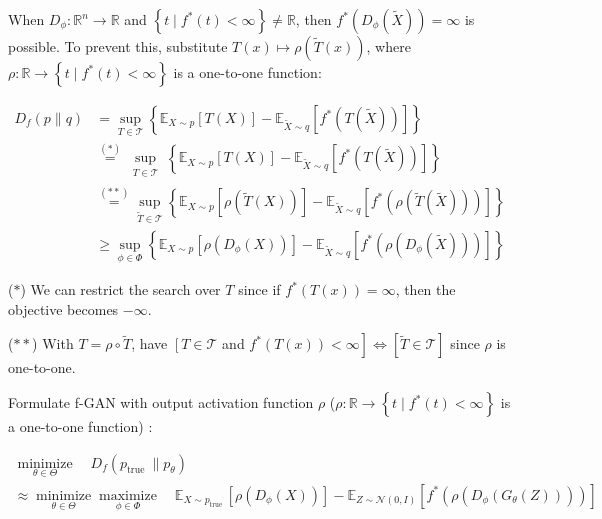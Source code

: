 \begin{concept}
    When $D_{\phi}: \mathbb{R}^{n} \rightarrow \mathbb{R}$ and $\left\{t \mid f^{*}(t)<\infty\right\} \neq \mathbb{R}$, then $f^{*}\left(D_{\phi}(\tilde{X})\right)=\infty$ is possible. To prevent this, substitute $T(x) \mapsto \rho(\tilde{T}(x))$, where $\rho: \mathbb{R} \rightarrow\left\{t \mid f^{*}(t)<\infty\right\}$ is a one-to-one function:

    $$
    \begin{aligned}
    D_{f}(p \| q) & =\sup _{T \in \mathcal{T}}\left\{\mathbb{E}_{X \sim p}[T(X)]-\mathbb{E}_{\tilde{X} \sim q}\left[f^{*}(T(\tilde{X}))\right]\right\} \\
    & \stackrel{(*)}{=} \sup _{\substack{T \in \mathcal{T}}}\left\{\mathbb{E}_{X \sim p}[T(X)]-\mathbb{E}_{\tilde{X} \sim q}\left[f^{*}(T(\tilde{X}))\right]\right\} \\
    & \stackrel{(* *)}{=} \sup _{\tilde{T} \in \mathcal{T}}\left\{\mathbb{E}_{X \sim p}[\rho(\tilde{T}(X))]-\mathbb{E}_{\tilde{X} \sim q}\left[f^{*}(\rho(\tilde{T}(\tilde{X})))\right]\right\} \\
    & \geq \sup _{\phi \in \Phi}\left\{\mathbb{E}_{X \sim p}\left[\rho\left(D_{\phi}(X)\right)\right]-\mathbb{E}_{\tilde{X} \sim q}\left[f^{*}\left(\rho\left(D_{\phi}(\tilde{X})\right)\right)\right]\right\}
    \end{aligned}
    $$

    ($*$) We can restrict the search over $T$ since if $f^{*}(T(x))=\infty$, then the objective becomes $-\infty$.

    ($**$) With $T=\rho \circ \tilde{T}$, have $\left[T \in \mathcal{T}\right.$ and $\left.f^{*}(T(x))<\infty\right] \Leftrightarrow[\tilde{T} \in \mathcal{T}]$ since $\rho$ is one-to-one.
\end{concept}

\begin{definition}
    Formulate f-GAN with output activation function $\rho$ ($\rho: \mathbb{R} \rightarrow\left\{t \mid f^{*}(t)<\infty\right\}$ is a one-to-one function) :

    $$
    \begin{gathered}
    \underset{\theta \in \Theta}{\operatorname{minimize}} \quad D_{f}\left(p_{\text {true }} \| p_{\theta}\right) \\
    \approx \underset{\theta \in \Theta}{\operatorname{minimize}} \underset{\phi \in \Phi}{\operatorname{maximize}} \quad \mathbb{E}_{X \sim p_{\text {true }}}\left[\rho\left(D_{\phi}(X)\right)\right]-\mathbb{E}_{Z \sim \mathcal{N}(0, I)}\left[f^{*}\left(\rho\left(D_{\phi}\left(G_{\theta}(Z)\right)\right)\right)\right]
    \end{gathered}
    $$
\end{definition}

